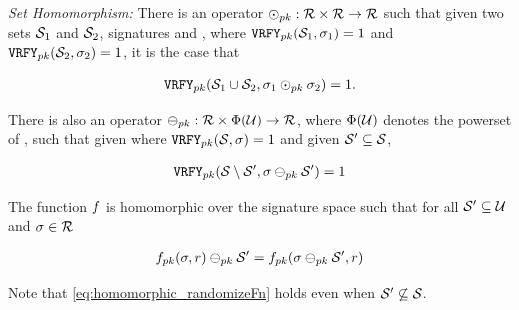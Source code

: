 \begin{definition}
		
	\itemListEnd
	
	\smallskip
	\textit{Set Homomorphism:} There is an operator
	$\sigHomomorphism[\pubKey]:
	\sigOutputSpace \times \sigOutputSpace
	\rightarrow \sigOutputSpace$ such that given two sets
	$\genericSetVar[1]$ and $\genericSetVar[2]$, signatures
	\genericSig[1] and \genericSig[2], where
	$\verify[\pubKey](\genericSetVar[1], \genericSig[1]) = 1$ and
	$\verify[\pubKey](\genericSetVar[2], \genericSig[2]) = 1$, it
	is the case that
	
	
	\begin{align}
		\label{eq:sig_homomorphism_union}
		\verify[\pubKey](\genericSetVar[1] \cup \genericSetVar[2],
		\genericSig[1] \sigHomomorphism[\pubKey] \genericSig[2]) = 1.
	\end{align}
	
	There is also an operator $\sigMinus[\pubKey]: \sigOutputSpace
	\times \powerset(\universe) \rightarrow
	\sigOutputSpace$, where $\Phi(\mathcal{U})$ denotes the powerset
          of \universe, such that given \genericSig where
	$\verify[\pubKey](\genericSetVar, \genericSig) = 1$ and given
	$\genericSetVarAlt \subseteq \genericSetVar$,
	
	
	
	\begin{align}
		\verify[\pubKey](\genericSetVar \setminus \genericSetVarAlt,
		\genericSig \sigMinus[\pubKey] \genericSetVarAlt) = 1 
		\label{eq:sig_homomorphism_minus} 
			\end{align}
	

	The function $\randomizeFn$ is homomorphic over the signature space such that for all $\genericSetVar' \subseteq \universe$ and $\genericSig \in \sigOutputSpace$

	\begin{align}
	\randomizeFn[\pubKey](\genericSig, \genericRand) \sigMinus[\pubKey] \genericSetVarAlt = 
		\randomizeFn[\pubKey](\genericSig \sigMinus[\pubKey] \genericSetVarAlt, 
		\genericRand) 
		\label{eq:homomorphic_randomizeFn}
	\end{align}

	Note that \eqref{eq:homomorphic_randomizeFn} holds even when $\genericSetVarAlt \not\subseteq \genericSetVar$. 

	
	
\end{definition}

